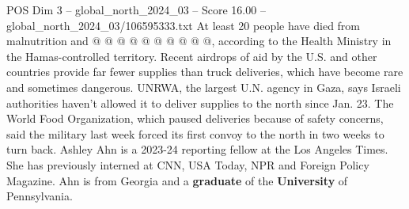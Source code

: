 \begin{textsample}{POS Dim 3 – global\_north\_2024\_03 – Score 16.00 – global\_north\_2024\_03/106595333.txt}
At least 20 people have died from malnutrition and @ @ @ @ @ @ @ @ @ @, according to the Health Ministry in the Hamas-controlled territory.
Recent airdrops of aid by the U.S. and other countries provide far fewer supplies than truck deliveries, which have become rare and sometimes dangerous.
UNRWA, the largest U.N. agency in Gaza, says Israeli authorities haven't allowed it to deliver supplies to the north since Jan. 23.
The World Food Organization, which paused deliveries because of safety concerns, said the military last week forced its first convoy to the north in two weeks to turn back.
Ashley Ahn is a 2023-24 reporting fellow at the Los Angeles Times.
She has previously interned at CNN, USA Today, NPR and Foreign Policy Magazine.
Ahn is from Georgia and a \textbf{graduate} of the \textbf{University} of Pennsylvania.

\end{textsample}
